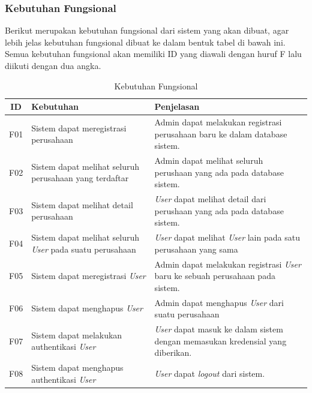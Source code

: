 \subsubsection{Kebutuhan Fungsional}
Berikut merupakan kebutuhan fungsional dari sistem yang akan dibuat, agar lebih jelas kebutuhan fungsional dibuat ke dalam bentuk tabel di bawah ini. Semua kebutuhan fungsional akan memiliki ID yang diawali dengan huruf F lalu diikuti dengan dua angka.

\begin{table}
  \caption{Kebutuhan Fungsional}
  \label{tab:kebutuhan-fungsional}
  \centering
  \begin{tabular}{|c|p{4.5cm}|p{8cm}|}
    \hline
    ID  & Kebutuhan                                                        & Penjelasan                                                                            \\
    \hline
    F01 & Sistem dapat meregistrasi perusahaan                             & Admin dapat melakukan registrasi perusahaan baru ke dalam database sistem.            \\
    \hline
    F02 & Sistem dapat melihat seluruh perusahaan yang terdaftar           & Admin dapat melihat seluruh perushaan yang ada pada database sistem.                  \\
    \hline
    F03 & Sistem dapat melihat detail perusahaan                           & \textit{User} dapat melihat detail dari perushaan yang ada pada database sistem.      \\
    \hline
    F04 & Sistem dapat melihat seluruh \textit{User} pada suatu perusahaan & \textit{User} dapat melihat \textit{User} lain pada satu perusahaan yang sama         \\
    \hline
    F05 & Sistem dapat meregistrasi \textit{User}                          & Admin dapat melakukan registrasi \textit{User} baru ke sebuah perusahaan pada sistem. \\
    \hline
    F06 & Sistem dapat menghapus \textit{User}                             & Admin dapat menghapus \textit{User} dari suatu perusahaan                             \\
    \hline
    F07 & Sistem dapat melakukan authentikasi \textit{User}                & \textit{User} dapat masuk ke dalam sistem dengan memasukan kredensial yang diberikan. \\
    \hline
    F08 & Sistem dapat menghapus authentikasi \textit{User}                & \textit{User} dapat \textit{logout} dari sistem.                                      \\

\end{tabular}
\end{table}
